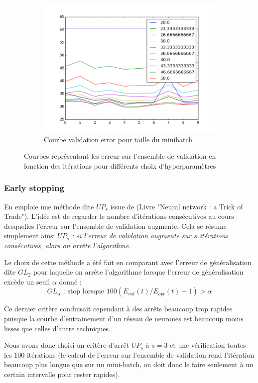 \documentclass[conference]{IEEEtran}
\begin{document}
\begin{figure}[h]
\begin{subfigure}{0.48\columnwidth}
\includegraphics[width=\textwidth]{fig/mb.png}
\caption{Courbe validation error pour taille du minibatch}
\end{subfigure}
\caption{Courbes représentant les erreur sur l'ensemble de validation en fonction des itérations pour différents choix d'hyperparamètres}
\label{hyper}
\end{figure}

\subsubsection{Early stopping}
En emploie une méthode dite $UP_s$ issue de \cite{Prechelt97earlystopping} (Livre "Neural network : a Trick of Trade"). L'idée est de regarder le nombre d'itérations consécutives au cours desquelles l'erreur sur l'ensemble de validation augmente. Cela se résume simplement ainsi \emph{$UP_s$ : si l'erreur de validation augmente sur $s$ itérations consécutives, alors on arrête l'algorithme.}

Le choix de cette méthode a été fait en comparant avec l'erreur de généralisation dite $GL_2$ pour laquelle on arrête l'algorithme lorsque l'erreur de généralisation excède un seuil $\alpha$ donné :
$$GL_\alpha\mbox{ : stop lorsque $100(E_{val}(t)/E_{opt}(t)-1)>\alpha$}$$

Ce dernier critère conduisait cependant à des arrêts beaucoup trop rapides puisque la courbe d'entrainement d'un réseau de neurones est beaucoup moins lisses que celles d'autre techniques.

Nous avons donc choisi un critère d'arrêt $UP_s$ à $s=3$ et une vérification toutes les 100 itérations (le calcul de l'erreur sur l'ensemble de validation rend l'itération beaucoup plus longue que sur un mini-batch, on doit donc le faire seulement à un certain intervalle pour rester rapides).
\end{document}
